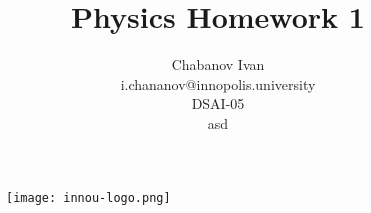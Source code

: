 \begin{titlepage}

    \begin{figure}[t]
        \centering
        \texttt{[image: innou-logo.png]} %
    \end{figure}
    
    \vspace{20mm}
    \title{Physics Homework 1}
    \author{Chabanov Ivan\\i.chananov@innopolis.university\\DSAI-05\\asd}
    \maketitle

\end{titlepage}